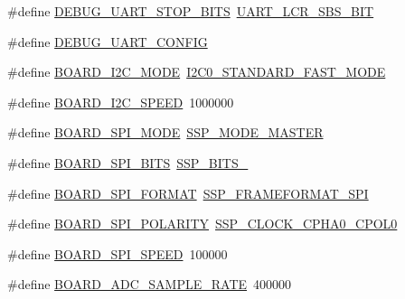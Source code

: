 \begin{DoxyCompactItemize}
\item 
\#define \hyperlink{group__hal_gacc0b498b69723d16453ec5321d766427}{D\+E\+B\+U\+G\+\_\+\+U\+A\+R\+T\+\_\+\+S\+T\+O\+P\+\_\+\+B\+I\+TS}~\hyperlink{group___u_a_r_t__18_x_x__43_x_x_ga70ccdedb76a079b8e7c87e5c3709469c}{U\+A\+R\+T\+\_\+\+L\+C\+R\+\_\+\+S\+B\+S\+\_\+B\+IT}
\item 
\#define \hyperlink{group__hal_ga31d6224b0a81c9e6a428fc2ce1072082}{D\+E\+B\+U\+G\+\_\+\+U\+A\+R\+T\+\_\+\+C\+O\+N\+F\+IG}
\item 
\#define \hyperlink{group__hal_ga0e300886a975da5cb65db5b241eb239b}{B\+O\+A\+R\+D\+\_\+\+I2\+C\+\_\+\+M\+O\+DE}~\hyperlink{group___s_c_u__18_x_x__43_x_x_ga3d2136c7b5dd51b79986b151192bba55}{I2\+C0\+\_\+\+S\+T\+A\+N\+D\+A\+R\+D\+\_\+\+F\+A\+S\+T\+\_\+\+M\+O\+DE}
\item 
\#define \hyperlink{group__hal_ga0183689a44409edabe8c145ee78ed335}{B\+O\+A\+R\+D\+\_\+\+I2\+C\+\_\+\+S\+P\+E\+ED}~1000000
\item 
\#define \hyperlink{group__hal_ga1bbd961c030ce3a56149348fbe1d13e4}{B\+O\+A\+R\+D\+\_\+\+S\+P\+I\+\_\+\+M\+O\+DE}~\hyperlink{group___s_s_p__18_x_x__43_x_x_gga2a375ed10848e3661b9b015fea1cf39ba5395d2342a5a2564d683efe73700d604}{S\+S\+P\+\_\+\+M\+O\+D\+E\+\_\+\+M\+A\+S\+T\+ER}
\item 
\#define \hyperlink{group__hal_gae88cc90089d786fbd464bdb7044d55ff}{B\+O\+A\+R\+D\+\_\+\+S\+P\+I\+\_\+\+B\+I\+TS}~\hyperlink{group___s_s_p__18_x_x__43_x_x_gga2f99e08511788c146ae9b35023e4a61cafed74a949c86fb130814553eeeaa28fc}{S\+S\+P\+\_\+\+B\+I\+T\+S\+\_}
\item 
\#define \hyperlink{group__hal_ga3d0601e312d64996d8cab493be3c0250}{B\+O\+A\+R\+D\+\_\+\+S\+P\+I\+\_\+\+F\+O\+R\+M\+AT}~\hyperlink{group___s_s_p__18_x_x__43_x_x_ggad3ae555ad43caa2b2a47bc4769d8fe50a04830722a3c3c26165b6e86944f80799}{S\+S\+P\+\_\+\+F\+R\+A\+M\+E\+F\+O\+R\+M\+A\+T\+\_\+\+S\+PI}
\item 
\#define \hyperlink{group__hal_gabbae270b8b4d3d6246035c4993d18382}{B\+O\+A\+R\+D\+\_\+\+S\+P\+I\+\_\+\+P\+O\+L\+A\+R\+I\+TY}~\hyperlink{group___s_s_p__18_x_x__43_x_x_ggab423240914ad746147aeb31f483e9553aa5340f759c78820f18de9290b9c061c9}{S\+S\+P\+\_\+\+C\+L\+O\+C\+K\+\_\+\+C\+P\+H\+A0\+\_\+\+C\+P\+O\+L0}
\item 
\#define \hyperlink{group__hal_gae6bd5c3023dea708cefcf1be2d5b4441}{B\+O\+A\+R\+D\+\_\+\+S\+P\+I\+\_\+\+S\+P\+E\+ED}~100000
\item 
\#define \hyperlink{group__hal_ga5d9a9a6c17d8e964672936721bc21dc2}{B\+O\+A\+R\+D\+\_\+\+A\+D\+C\+\_\+\+S\+A\+M\+P\+L\+E\+\_\+\+R\+A\+TE}~400000

\end{DoxyCompactItemize}
